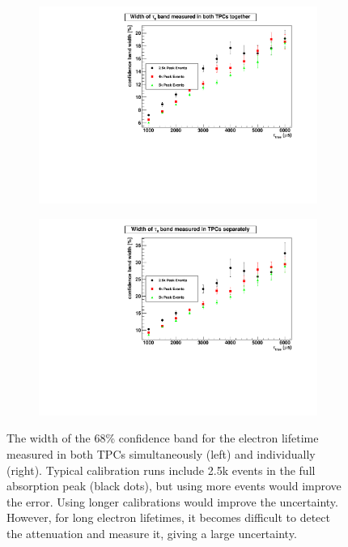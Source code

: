 \documentclass[herrin-thesis.tex]{subfiles}
\begin{document}
\begin{figure}[htbp]
\begin{subfigure}[b]{0.5\linewidth}
\centering
\includegraphics[width=1.0\columnwidth]{./plots/el_sim_width_both.pdf}
\end{subfigure}%
\begin{subfigure}[b]{0.5\linewidth}
\centering
\includegraphics[width=1.0\columnwidth]{./plots/el_sim_width_indiv.pdf}
\end{subfigure}
\caption[Confidence band widths for electron lifetime measurements]{The width of the 68\% confidence band for the electron lifetime measured in both TPCs simultaneously (left) and individually (right). Typical calibration runs include 2.5k events in the full absorption peak (black dots), but using more events would improve the error. Using longer calibrations would improve the uncertainty. However, for long electron lifetimes, it becomes difficult to detect the attenuation and measure it, giving a large uncertainty.}
\label{fig:sim_width}
\end{figure}
\end{document}
